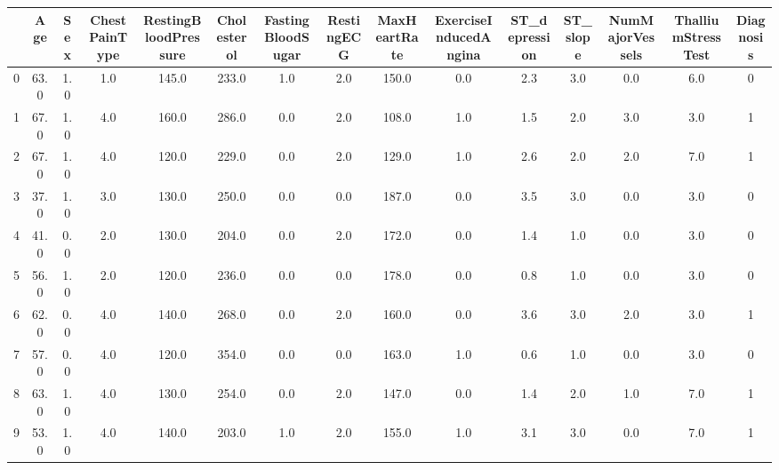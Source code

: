 \begin{tabular}{lcccccccccccccc}
\toprule
{} &   Age &  Sex &  ChestPainType &  RestingBloodPressure &  Cholesterol &  FastingBloodSugar &  RestingECG &  MaxHeartRate &  ExerciseInducedAngina &  ST\_depression &  ST\_slope &  NumMajorVessels &  ThalliumStressTest &  Diagnosis \\
\midrule
0 &  63.0 &  1.0 &            1.0 &                 145.0 &        233.0 &                1.0 &         2.0 &         150.0 &                    0.0 &            2.3 &       3.0 &              0.0 &                 6.0 &          0 \\
1 &  67.0 &  1.0 &            4.0 &                 160.0 &        286.0 &                0.0 &         2.0 &         108.0 &                    1.0 &            1.5 &       2.0 &              3.0 &                 3.0 &          1 \\
2 &  67.0 &  1.0 &            4.0 &                 120.0 &        229.0 &                0.0 &         2.0 &         129.0 &                    1.0 &            2.6 &       2.0 &              2.0 &                 7.0 &          1 \\
3 &  37.0 &  1.0 &            3.0 &                 130.0 &        250.0 &                0.0 &         0.0 &         187.0 &                    0.0 &            3.5 &       3.0 &              0.0 &                 3.0 &          0 \\
4 &  41.0 &  0.0 &            2.0 &                 130.0 &        204.0 &                0.0 &         2.0 &         172.0 &                    0.0 &            1.4 &       1.0 &              0.0 &                 3.0 &          0 \\
5 &  56.0 &  1.0 &            2.0 &                 120.0 &        236.0 &                0.0 &         0.0 &         178.0 &                    0.0 &            0.8 &       1.0 &              0.0 &                 3.0 &          0 \\
6 &  62.0 &  0.0 &            4.0 &                 140.0 &        268.0 &                0.0 &         2.0 &         160.0 &                    0.0 &            3.6 &       3.0 &              2.0 &                 3.0 &          1 \\
7 &  57.0 &  0.0 &            4.0 &                 120.0 &        354.0 &                0.0 &         0.0 &         163.0 &                    1.0 &            0.6 &       1.0 &              0.0 &                 3.0 &          0 \\
8 &  63.0 &  1.0 &            4.0 &                 130.0 &        254.0 &                0.0 &         2.0 &         147.0 &                    0.0 &            1.4 &       2.0 &              1.0 &                 7.0 &          1 \\
9 &  53.0 &  1.0 &            4.0 &                 140.0 &        203.0 &                1.0 &         2.0 &         155.0 &                    1.0 &            3.1 &       3.0 &              0.0 &                 7.0 &          1 \\
\bottomrule
\end{tabular}
